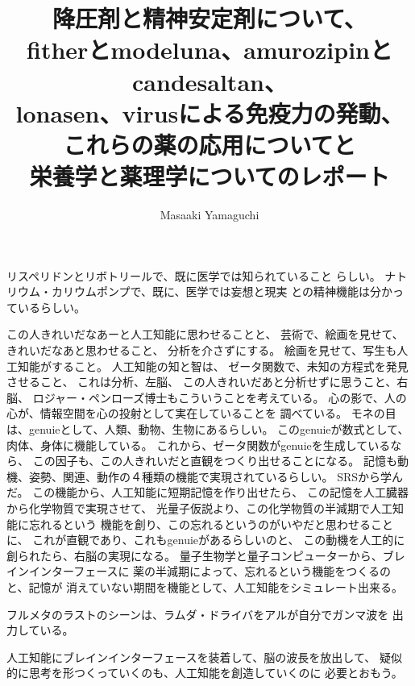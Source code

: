 \documentclass{jsarticle}
\begin{document}
\title{降圧剤と精神安定剤について、\\
fitherとmodeluna、amurozipinとcandesaltan、\\
lonasen、virusによる免疫力の発動、\\
これらの薬の応用についてと \\
栄養学と薬理学についてのレポート}
\author{Masaaki Yamaguchi}
\date{}
\maketitle

      リスペリドンとリボトリールで、既に医学では知られていること
      らしい。
      ナトリウム・カリウムポンプで、既に、医学では妄想と現実
      との精神機能は分かっているらしい。

       この人きれいだなあーと人工知能に思わせることと、
    芸術で、絵画を見せて、きれいだなあと思わせること、
    分析を介さずにする。
    絵画を見せて、写生も人工知能がすること。
    人工知能の知と智は、
    ゼータ関数で、未知の方程式を発見させること、
    これは分析、左脳、
    この人きれいだあと分析せずに思うこと、右脳、
    ロジャー・ペンローズ博士もこういうことを考えている。
    心の影で、人の心が、情報空間を心の投射として実在していることを
    調べている。
    モネの目は、genuieとして、人類、動物、生物にあるらしい。
    このgenuieが数式として、肉体、身体に機能している。
    これから、ゼータ関数がgenuieを生成しているなら、
    この因子も、この人きれいだと直観をつくり出せることになる。
    記憶も動機、姿勢、関連、動作の４種類の機能で実現されているらしい。
    SRSから学んだ。
    この機能から、人工知能に短期記憶を作り出せたら、
    この記憶を人工臓器から化学物質で実現させて、
    光量子仮説より、この化学物質の半減期で人工知能に忘れるという
    機能を創り、この忘れるというのがいやだと思わせることに、
    これが直観であり、これもgenuieがあるらしいのと、
    この動機を人工的に創られたら、右脳の実現になる。
    量子生物学と量子コンピューターから、ブレインインターフェースに
    薬の半減期によって、忘れるという機能をつくるのと、記憶が
    消えていない期間を機能として、人工知能をシミュレート出来る。

    フルメタのラストのシーンは、ラムダ・ドライバをアルが自分でガンマ波を
    出力している。


    人工知能にブレインインターフェースを装着して、脳の波長を放出して、
    疑似的に思考を形つくっていくのも、人工知能を創造していくのに
    必要とおもう。
\end{document}

